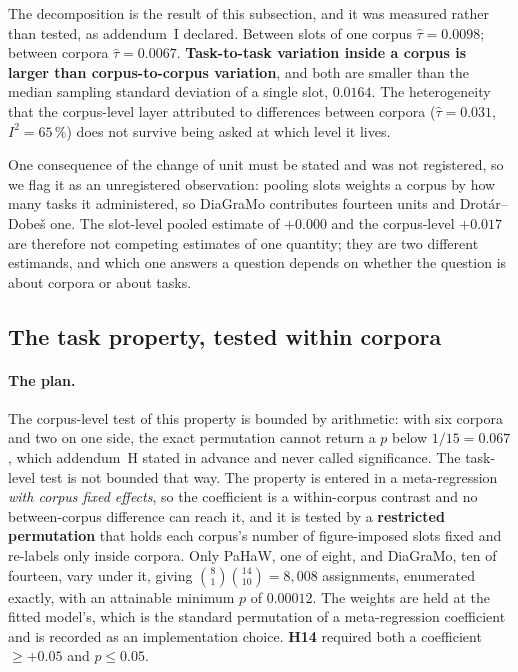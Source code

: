 The decomposition is the result of this subsection, and it was measured rather than tested, as
addendum~I declared. Between slots of one corpus $\hat\tau = 0.0098$; between corpora
$\hat\tau = 0.0067$. \textbf{Task-to-task variation inside a corpus is larger than
corpus-to-corpus variation}, and both are smaller than the median sampling standard deviation of a
single slot, $0.0164$. The heterogeneity that the corpus-level layer attributed to differences
between corpora ($\hat\tau = 0.031$, $I^2 = 65\,\%$) does not survive being asked at which level it
lives.

One consequence of the change of unit must be stated and was not registered, so we flag it as an
unregistered observation: pooling slots weights a corpus by how many tasks it administered, so
DiaGraMo contributes fourteen units and Drot\'ar--Dobe\v{s} one. The slot-level pooled estimate of
$+0.000$ and the corpus-level $+0.017$ are therefore not competing estimates of one quantity; they
are two different estimands, and which one answers a question depends on whether the question is
about corpora or about tasks.

\subsection{The task property, tested within corpora}
\label{sec:stats-moderator}
\label{sec:when}

\paragraph{The plan.} The corpus-level test of this property is bounded by arithmetic: with six
corpora and two on one side, the exact permutation cannot return a $p$ below $1/15 = 0.067$, which
addendum~H stated in advance and never called significance. The task-level test is not bounded that
way. The property is entered in a meta-regression \emph{with corpus fixed effects}, so the
coefficient is a within-corpus contrast and no between-corpus difference can reach it, and it is
tested by a \textbf{restricted permutation} that holds each corpus's number of figure-imposed slots
fixed and re-labels only inside corpora. Only PaHaW, one of eight, and DiaGraMo, ten of fourteen,
vary under it, giving $\binom{8}{1}\binom{14}{10} = 8{,}008$ assignments, enumerated exactly, with
an attainable minimum $p$ of $0.00012$. The weights are held at the fitted model's, which is the
standard permutation of a meta-regression coefficient and is recorded as an implementation choice.
\textbf{H14} required both a coefficient $\ge +0.05$ and $p \le 0.05$.

